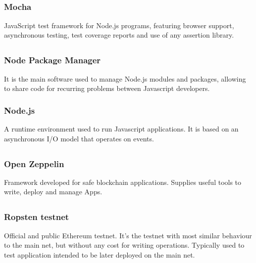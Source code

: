 	\subsection*{}
		\subsubsection*{Mocha}
			JavaScript test framework for Node.js programs, featuring browser support, asynchronous testing, test coverage reports and use of any assertion library.
	
	\subsection*{}
		\subsubsection*{Node Package Manager}
			It is the main software used to manage Node.js modules and packages, allowing to share code for recurring problems between Javascript developers.
		\subsubsection*{Node.js}
			A runtime environment used to run Javascript applications. It is based on an asynchronous I/O model that operates on events.
	
	\subsection*{}
		\subsubsection*{Open Zeppelin}
			Framework developed for safe blockchain applications. Supplies useful tools to write, deploy and manage \DJ{}Apps.
      
	\subsection*{}
		\subsubsection*{Ropsten testnet}
			Official and public Ethereum testnet. It's the testnet with most similar behaviour to the main net, but without any cost for writing operations. Typically used to test application intended to be later deployed on the main net.
      
